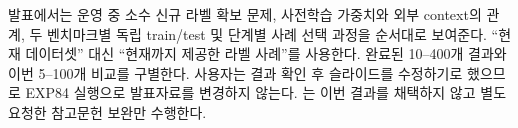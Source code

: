 발표에서는 운영 중 소수 신규 라벨 확보 문제, 사전학습 가중치와 외부 context의 관계, 두 벤치마크별 독립 train/test 및 단계별 사례 선택 과정을 순서대로 보여준다. ``현재 데이터셋'' 대신 ``현재까지 제공한 라벨 사례''를 사용한다. 완료된 10--400개 결과와 이번 5--100개 비교를 구별한다. 사용자는 결과 확인 후 슬라이드를 수정하기로 했으므로 EXP84 실행으로 발표자료를 변경하지 않는다. 는 이번 결과를 채택하지 않고 별도 요청한 참고문헌 보완만 수행한다.

